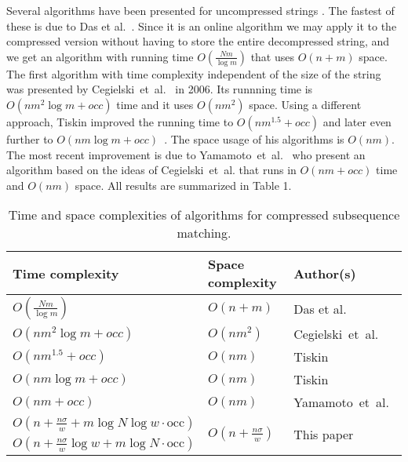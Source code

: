 \documentclass[11pt]{article}
\begin{document}
Several algorithms have been presented for uncompressed strings \cite{mannila1997discovery,das1997episode,boasson1999window,cegielski2006multiple,baeza1991searching,tronicek2001episode,crochemore2003directed}. The fastest of these is due to Das et al.~\cite{das1997episode}. Since it is an online algorithm we may apply it to the compressed version without having to store the entire decompressed string, and we get an algorithm with running time $O(\frac{Nm}{\log m})$ that uses $O(n+m)$ space. The first algorithm with time complexity independent of the size of the string was presented by Cegielski~et~al.~\cite{cegielski2006window} in 2006. Its runnning time is $O(nm^2\log m+occ)$ time and it uses $O(nm^2)$ space. Using a different approach, Tiskin improved the running time to $O(nm^{1.5}+occ)$ \cite{tiskin2009faster} and later even further to $O(nm\log m+occ)$~\cite{tiskin2011towards}. The space usage of his algorithms is $O(nm)$. The most recent improvement is due to Yamamoto~et~al.~\cite{yamamoto2011faster} who present an algorithm based on the ideas of Cegielski~et~al. that runs in $O(nm+occ)$ time and $O(nm)$ space. All results are summarized in Table 1.

\begin{table}[h]\label{tab:results}
\begin{center}
\begin{tabular}{lll}
	\hline
	Time complexity & Space complexity & Author(s) \\
	\hline
	$O(\frac{Nm}{\log m})$ & $O(n+m)$ & Das et al.~\cite{das1997episode} \\
	$O(nm^2\log m+occ)$ & $O(nm^2)$ & Cegielski~et~al.~\cite{cegielski2006window} \\
	$O(nm^{1.5}+occ)$ & $O(nm)$ & Tiskin~\cite{tiskin2009faster} \\
	$O(nm\log m+occ)$ & $O(nm)$ & Tiskin~\cite{tiskin2011towards} \\
	$O(nm+occ)$ & $O(nm)$ & Yamamoto~et~al.~\cite{yamamoto2011faster} \\
	\hline
	$O(n+\frac{n\sigma}{w}+m\log N\log w\cdot \text{occ})$ & \multirow{2}{*}{$O(n+\frac{n\sigma}{w})$} & \multirow{2}{*}{This paper} \\	
	$O(n+\frac{n\sigma}{w}\log w+m\log N\cdot \text{occ})$ & & \\
	\hline
\end{tabular}
\caption{Time and space complexities of algorithms for compressed subsequence matching.}
\end{center}
\end{table}
\end{document}
